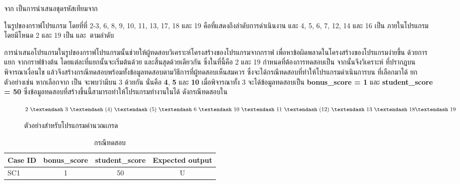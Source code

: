 {จาก{} เป็นการนำเสนอชุดรหัสเทียมจาก{ ในรูปของกราฟโปรแกรม 
โดยที่{\Node}ที่ 2-3, 6, 8, 9, 10, 11, 13, 17, 18 และ 19 คือ{\Node}ที่แสดงถึงลำดับการดำเนินงาน 
และ{\Node} 4, 5, 6, 7, 12, 14 และ 16 เป็น{\FirstTimeDefine{\PredicateNode}{\PredicateNodeEN}} ภายในโปรแกรม 
โดยมีโหนด 2 และ 19 เป็น{\FirstTimeDefine{\sourcenode}{\sourcenodeEN}} 
และ{\FirstTimeDefine{\sinknode}{\sinknodeEN}}\ ตามลำดับ 

การนำเสนอโปรแกรมในรูปของกราฟโปรแกรมนั้นช่วยให้ผู้ทดสอบวิเคราะห์โครงสร้างของโปรแกรมจากกราฟ 
เพื่อหาข้อผิดพลาดในโครงสร้างของโปรแกรมง่ายขึ้น ด้วยการแยก{\FirstTimeDefine{\BasisPath}{\BasisPathEN}} 
จากกราฟข้างต้น โดยแต่ละ{\BasisPath}ที่แยกนั้นจะเริ่มต้นด้วย{\sourcenode} และสิ้นสุดด้วย{\sinknode}เดียวกัน ซึ่งในที่นี้คือ 2 และ 19
กำหนด{\BasisPath}ที่ต้องการทดสอบเป็น \FirstTimeDefine{\TestPath}{\TestPathEN} จากนั้นจึงวิเคราะห์{\PredicateNode}
ที่ปรากฎบน{\TestPath} พิจารณาเงื่อนไข แล้วจึงสร้างกรณีทดสอบพร้อมทั้งข้อมูลทดสอบตามวิธีการที่ผู้ทดสอบเห็นสมควร 
ซึ่งจะได้กรณีทดสอบที่ทำให้โปรแกรมดำเนินการบน{\TestPath} ที่เลือกมาได้ ยกตัวอย่างเช่น 
หากเลือก{\BasisPath}จาก{} เป็น{\TestPath} จะพบว่ามี{\PredicateNode}บน{\TestPath} 3 {\Node} 
ด้วยกัน นั่นคือ {\bf 4}, {\bf 5} และ {\bf 10} เมื่อพิจารณา{\PredicateNode}ทั้ง 3 {\Node}จะได้ข้อมูลทดสอบเป็น {\bf bonus\_score = 1} และ 
{\bf student\_score = 50} ซึ่งข้อมูลทดสอบที่สร้างขึ้นนี้สามารถทำให้โปรแกรมทำงานใน{\TestPath}ได้ 
ดังกรณีทดสอบใน

\clearpage
\begin{figure}[ht!]
    \centering
    \small{$2\ \textendash\ 3\ \textendash\ 
                (4)\ \textendash\ (5)\ \textendash\ 6\ \textendash\ 10\ \textendash\ 
                11\ \textendash\ (12)\ \textendash\ 13\ \textendash\ 18 \textendash\ 19$}
    \caption{ตัวอย่าง{\TestPath}สำหรับโปรแกรมคำนวณเกรด}
    \label{fig:testpath}
\end{figure}


\begin{table}[ht!]
    \centering
    \caption{กรณีทดสอบ}
    \label{tab:simpleTestCase}
    \begin{tabular}{|l|c|c|c|}
    \hline
    \rowcolor{LightGray}
    Case ID     & bonus\_score  & student\_score    & Expected output \\
    \hline
    SC1         & 1             & 50                & U \\
    \hline
    \end{tabular}
\end{table}

}}
